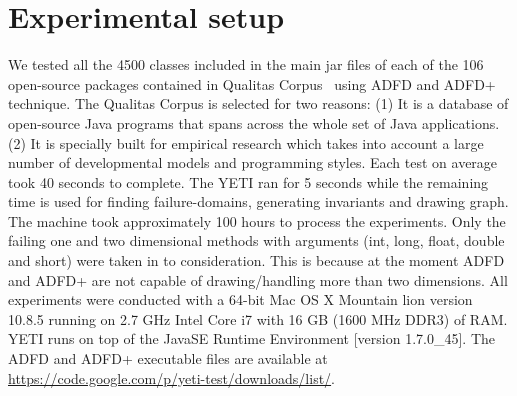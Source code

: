 \documentclass[runningheads,a4paper]{llncs}
\begin{document}





\section{Experimental setup}
We tested all the 4500 classes included in the main jar files of each of the 106 open-source packages contained in Qualitas Corpus~\cite{Tempero2010} using ADFD and ADFD+ technique. The Qualitas Corpus is selected for two reasons: (1) It is a database of open-source Java programs that spans across the whole set of Java applications. (2) It is specially built for empirical research which takes into account a large number of developmental models and programming styles. Each test on average took 40 seconds to complete. The YETI ran for 5 seconds while the remaining time is used for finding failure-domains, generating invariants and drawing graph. The machine took approximately 100 hours to process the experiments. Only the failing one and two dimensional methods with arguments (int, long, float, double and short) were taken in to consideration. This is because at the moment ADFD and ADFD+ are not capable of drawing/handling more than two dimensions. All experiments were conducted with a 64-bit Mac OS X Mountain lion version 10.8.5 running on 2.7 GHz Intel Core i7 with 16 GB (1600 MHz DDR3) of RAM. YETI runs on top of the Java\texttrademark  SE Runtime Environment [version 1.7.0\_45]. The ADFD and ADFD+ executable files are available at \url{https://code.google.com/p/yeti-test/downloads/list/}. 
\end{document}
